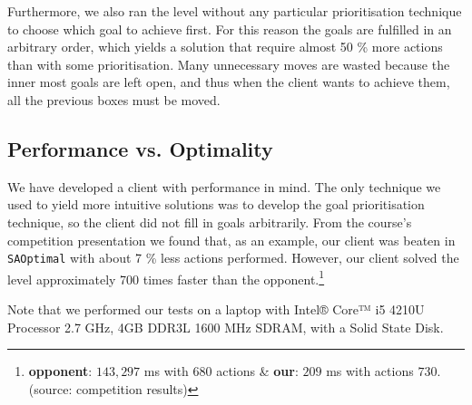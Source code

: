 Furthermore, we also ran the level without any particular prioritisation technique to choose which goal to achieve first.
For this reason the goals are fulfilled in an arbitrary order, which yields a solution that require almost 50 \% more actions than with some prioritisation.
Many unnecessary moves are wasted because the inner most goals are left open, and thus when the client wants to achieve them, all the previous boxes must be moved.

\subsection{Performance vs. Optimality}
\label{sec:performance vs. optimality}

We have developed a client with performance in mind.
The only technique we used to yield more intuitive solutions was to develop the goal prioritisation technique, so the client did not fill in goals arbitrarily.
From the course's competition presentation we found that, as an example, our client was beaten in \texttt{SAOptimal} with about 7 \% less actions performed.
However, our client solved the level approximately 700 times faster than the opponent.\footnote{\textbf{opponent}: $143,297$ ms with $680$ actions \& \textbf{our}: $209$ ms with actions $730$. (source: competition results)}

Note that we performed our tests on a laptop with Intel® Core™ i5 4210U Processor 2.7 GHz, 4GB DDR3L 1600 MHz SDRAM, with a Solid State Disk.
